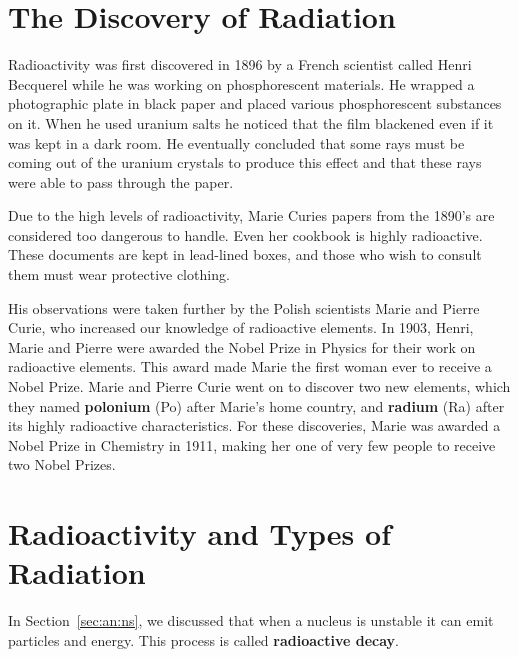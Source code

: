 



\section{The Discovery of Radiation}
\label{sec:an:td}

Radioactivity was first discovered in 1896 by a French scientist called Henri Becquerel while he was working on phosphorescent materials. He wrapped a photographic plate in black paper and placed various phosphorescent substances on it. When he used uranium salts he noticed that the film blackened even if it was kept in a dark room. He eventually concluded that some rays must be coming out of the uranium crystals to produce this effect and that these rays were able to pass through the paper. \\

\begin{IFact}
{Due to the high levels of radioactivity, Marie Curies papers from the 1890's are considered too dangerous to handle. Even her cookbook is highly radioactive. These documents are kept in lead-lined boxes, and those who wish to consult them must wear protective clothing. }
\end{IFact}

His observations were taken further by the Polish scientists Marie and Pierre Curie, who increased our knowledge of radioactive elements. In 1903, Henri, Marie and Pierre were awarded the Nobel Prize in Physics for their work on radioactive elements. This award made Marie the first woman ever to receive a Nobel Prize. Marie and Pierre Curie went on to discover two new elements, which they named \textbf{polonium} (Po) after Marie's home country, and \textbf{radium} (Ra) after its highly radioactive characteristics. For these discoveries, Marie was awarded a Nobel Prize in Chemistry in 1911, making her one of very few people to receive two Nobel Prizes. 





\section{Radioactivity and Types of Radiation}
\label{sec:an:r}

In Section~\ref{sec:an:ns}, we discussed that when a nucleus is unstable it can emit particles and energy. This process is called \textbf{radioactive decay}.

